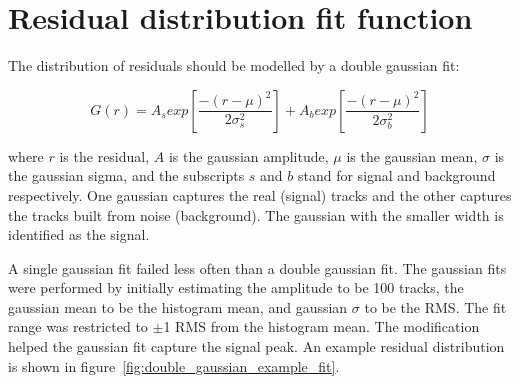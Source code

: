 
\section{Residual distribution fit function}
\label{appendix:systematics_res_fit_fcn}


The distribution of residuals should be modelled by a double gaussian fit\cite{lefebvre_thesis}:

\begin{equation}
\label{eqn:doub_gaus}
G(r) = A_{s}exp\left[ \frac{-(r-\mu)^{2}}{2\sigma_s^{2}} \right] + A_{b}exp\left[ \frac{-(r-\mu)^{2}}{2\sigma_b^{2}} \right]
\end{equation}

where $r$ is the residual, $A$ is the gaussian amplitude, $\mu$ is the gaussian mean, $\sigma$ is the gaussian sigma, and the subscripts $s$ and $b$ stand for signal and background respectively. One gaussian captures the real (signal) tracks and the other captures the tracks built from noise (background). The gaussian with the smaller width is identified as the signal. 

A single gaussian fit failed less often than a double gaussian fit. The gaussian fits were performed by initially estimating the amplitude to be 100 tracks, the gaussian mean to be the histogram mean, and gaussian $\sigma$ to be the RMS. The fit range was restricted to $\pm$1 RMS from the histogram mean. The modification helped the gaussian fit capture the signal peak. An example residual distribution is shown in figure~\ref{fig:double_gaussian_example_fit}. 


